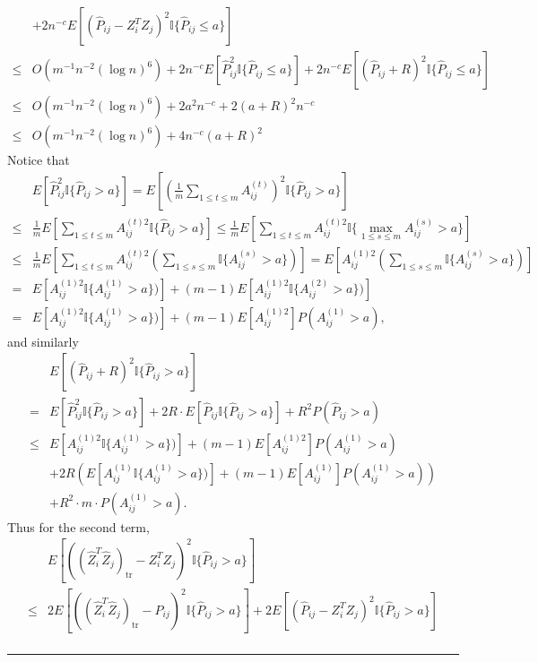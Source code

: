 \documentclass[a4paper]{article}
\newenvironment{proof}{{\bf Proof:  }}{\hfill\rule{2mm}{2mm}}
\begin{document}
\begin{proof}
\begin{align*}
	& + 2 n^{-c} E[(\hat{P}_{ij} - Z_i^T Z_j)^2 \mathbb{I}\{\hat{P}_{ij} \le a\}] \\
	\le & O(m^{-1} n^{-2} (\log n)^6) + 2 n^{-c} E[\hat{P}_{ij}^2 \mathbb{I}\{\hat{P}_{ij} \le a\}] + 2 n^{-c} E[(\hat{P}_{ij} + R)^2 \mathbb{I}\{\hat{P}_{ij} \le a\}] \\
	\le & O(m^{-1} n^{-2} (\log n)^6) + 2 a^2 n^{-c} + 2 (a+R)^2 n^{-c} \\
	\le & O(m^{-1} n^{-2} (\log n)^6) + 4 n^{-c} (a + R)^2
\end{align*}
Notice that
\begin{align*}
	& E[\hat{P}_{ij}^2 \mathbb{I} \{ \hat{P}_{ij} > a \}]
	= E[(\frac{1}{m} \sum_{1 \le t \le m} A_{ij}^{(t)})^2 \mathbb{I} \{ \hat{P}_{ij} > a \}] \\
	\le & \frac{1}{m} E[\sum_{1 \le t \le m} A_{ij}^{(t)2} \mathbb{I} \{ \hat{P}_{ij} > a \}]
	\le \frac{1}{m} E[\sum_{1 \le t \le m} A_{ij}^{(t)2} \mathbb{I} \{ \max_{1 \le s \le m} A_{ij}^{(s)} > a \}] \\
	\le & \frac{1}{m} E[\sum_{1 \le t \le m} A_{ij}^{(t)2} (\sum_{1 \le s \le m}\mathbb{I} \{ A_{ij}^{(s)} > a \})]
	= E[A_{ij}^{(1)2} (\sum_{1 \le s \le m}\mathbb{I} \{ A_{ij}^{(s)} > a \})] \\
	= & E[A_{ij}^{(1)2} \mathbb{I} \{ A_{ij}^{(1)} > a \})] + (m-1) E[A_{ij}^{(1)2} \mathbb{I} \{ A_{ij}^{(2)} > a \})] \\
	= & E[A_{ij}^{(1)2} \mathbb{I} \{ A_{ij}^{(1)} > a \})] + (m-1) E[A_{ij}^{(1)2}] P(A_{ij}^{(1)} > a),
\end{align*}
and similarly
\begin{align*}
	& E[(\hat{P}_{ij} + R)^2 \mathbb{I} \{ \hat{P}_{ij} > a \}] \\
	= & E[\hat{P}_{ij}^2 \mathbb{I} \{ \hat{P}_{ij} > a \}] + 2R \cdot E[\hat{P}_{ij} \mathbb{I} \{ \hat{P}_{ij} > a \}] + R^2 P(\hat{P}_{ij} > a) \\
	\le & E[A_{ij}^{(1)2} \mathbb{I} \{ A_{ij}^{(1)} > a \})] + (m-1) E[A_{ij}^{(1)2}] P(A_{ij}^{(1)} > a) \\
	& + 2R \left( E[A_{ij}^{(1)} \mathbb{I} \{ A_{ij}^{(1)} > a \})] + (m-1) E[A_{ij}^{(1)}] P(A_{ij}^{(1)} > a) \right) \\
	& + R^2 \cdot m \cdot P(A_{ij}^{(1)} > a).
\end{align*}
Thus for the second term,
\begin{align*}
	& E[((\hat{Z}_i^T \hat{Z}_j)_{\mathrm{tr}} - Z_i^T Z_j)^2 \mathbb{I}\{\hat{P}_{ij} > a\}] \\
	\le & 2 E[((\hat{Z}_i^T \hat{Z}_j)_{\mathrm{tr}} - \hat{P}_{ij})^2 \mathbb{I}\{\hat{P}_{ij} > a\}] + 2 E[(\hat{P}_{ij} - Z_i^T Z_j)^2 \mathbb{I}\{\hat{P}_{ij} > a\}] \\

\end{align*}
\end{proof}
\end{document}
